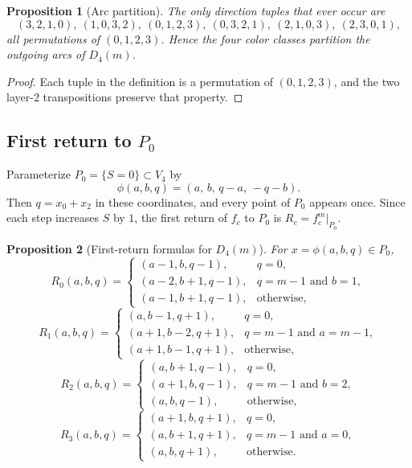 \documentclass[11pt]{article}
\newtheorem{proposition}{Proposition}
\newcommand{\Pzero}{P_0}
\begin{document}
\begin{proposition}[Arc partition]\label{prop:d4-tuples}
The only direction tuples that ever occur are
\[
(3,2,1,0),\ (1,0,3,2),\ (0,1,2,3),\ (0,3,2,1),\ (2,1,0,3),\ (2,3,0,1),
\]
all permutations of $(0,1,2,3)$.
Hence the four color classes partition the outgoing arcs of $D_4(m)$.
\end{proposition}

\begin{proof}
Each tuple in the definition is a permutation of $(0,1,2,3)$, and the two layer-$2$ transpositions preserve that property.
\end{proof}

\subsection{First return to \texorpdfstring{$\Pzero$}{P0}}\label{sec:d4-first-return}

Parameterize $\Pzero=\{S=0\}\subset V_4$ by
\[
\phi(a,b,q)=(a,\,b,\,q-a,\,-q-b).
\]
Then $q=x_0+x_2$ in these coordinates, and every point of $\Pzero$ appears once.
Since each step increases $S$ by $1$, the first return of $f_c$ to $\Pzero$ is $R_c=f_c^m|_{\Pzero}$.

\begin{proposition}[First-return formulas for $D_4(m)$]\label{prop:d4-R}
For $x=\phi(a,b,q)\in\Pzero$,
\[
R_0(a,b,q)=
\begin{cases}
(a-1,b,q-1), & q=0,\\
(a-2,b+1,q-1), & q=m-1 \text{ and } b=1,\\
(a-1,b+1,q-1), & \text{otherwise,}
\end{cases}
\]
\[
R_1(a,b,q)=
\begin{cases}
(a,b-1,q+1), & q=0,\\
(a+1,b-2,q+1), & q=m-1 \text{ and } a=m-1,\\
(a+1,b-1,q+1), & \text{otherwise,}
\end{cases}
\]
\[
R_2(a,b,q)=
\begin{cases}
(a,b+1,q-1), & q=0,\\
(a+1,b,q-1), & q=m-1 \text{ and } b=2,\\
(a,b,q-1), & \text{otherwise,}
\end{cases}
\]
\[
R_3(a,b,q)=
\begin{cases}
(a+1,b,q+1), & q=0,\\
(a,b+1,q+1), & q=m-1 \text{ and } a=0,\\
(a,b,q+1), & \text{otherwise.}
\end{cases}
\]
\end{proposition}
\end{document}
